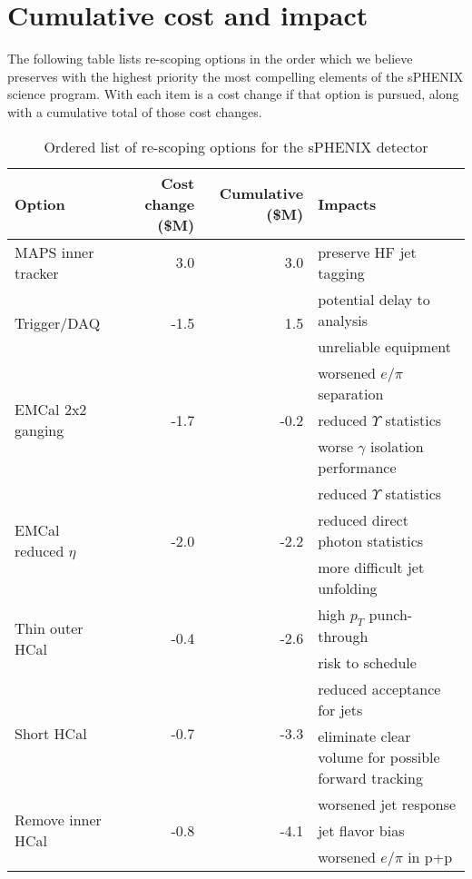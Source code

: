 
\section{Cumulative cost and impact}
\label{sec:cumul-cost-impact}

The following table lists re-scoping options in the order which we
believe preserves with the highest priority the most compelling
elements of the sPHENIX science program.  With each item is a cost
change if that option is pursued, along with a cumulative total of
those cost changes.

\renewcommand{\arraystretch}{1.4}
\begin{table}
  \begin{tabular}{lrrp{2in}}
    \toprule
    Option & Cost change (\$M) & Cumulative (\$M) & Impacts \\
    \midrule
    MAPS inner tracker & 3.0 & 3.0 & preserve HF jet tagging \\
    \midrule
    \multirow{2}{*}{Trigger/DAQ} & \multirow{2}{*}{-1.5} & \multirow{2}{*}{1.5} & potential delay to analysis \\
    & & &  unreliable equipment \\
    \midrule
    \multirow{3}{*}{EMCal 2x2 ganging} & \multirow{3}{*}{-1.7} & \multirow{3}{*}{-0.2}
    & worsened $e/\pi$ separation \\
    & & & reduced $\Upsilon$ statistics \\
    & & & worse $\gamma$ isolation
    performance \\
    \midrule
    \multirow{3}{*}{EMCal reduced $\eta$} & \multirow{3}{*}{-2.0} & \multirow{3}{*}{-2.2} & reduced $\Upsilon$
    statistics \\
    & & &  reduced direct photon statistics \\
    & & & more difficult jet    unfolding \\
    \midrule
    \multirow{2}{*}{Thin outer HCal} & \multirow{2}{*}{-0.4} &
    \multirow{2}{*}{-2.6} & high $p_T$ punch-through \\
    & & & risk to
    schedule \\
    \midrule
    \multirow{2}{*}{Short HCal} & \multirow{2}{*}{-0.7} & \multirow{2}{*}{-3.3} & reduced acceptance for jets \\
    & & & eliminate clear volume for possible forward tracking \\
    \midrule
    \multirow{3}{*}{Remove inner HCal} & \multirow{3}{*}{-0.8} &
    \multirow{3}{*}{-4.1} & worsened jet response \\ 
    & & & jet flavor bias \\
    & & & worsened $e/\pi$ in p+p \\
    \bottomrule
  \end{tabular}
  \caption{Ordered list of re-scoping options for the sPHENIX detector}
  \label{tab:rescoping_options}
\end{table}